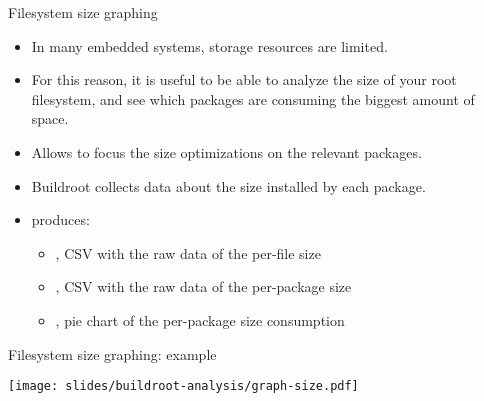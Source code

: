 \begin{frame}{Filesystem size graphing}
  \begin{itemize}
  \item In many embedded systems, storage resources are limited.
  \item For this reason, it is useful to be able to analyze the size
    of your root filesystem, and see which packages are consuming the
    biggest amount of space.
  \item Allows to focus the size optimizations on the relevant
    packages.
  \item Buildroot collects data about the size installed by each
    package.
  \item {} produces:
    \begin{itemize}
    \item {}, CSV with the raw data of the
      per-file size
    \item {}, CSV with the raw data of the
      per-package size
    \item {}, pie chart of the per-package size
      consumption
    \end{itemize}
  \end{itemize}
\end{frame}

\begin{frame}{Filesystem size graphing: example}
  \begin{center}
    \texttt{[image: slides/buildroot-analysis/graph-size.pdf]}
  \end{center}
\end{frame}
